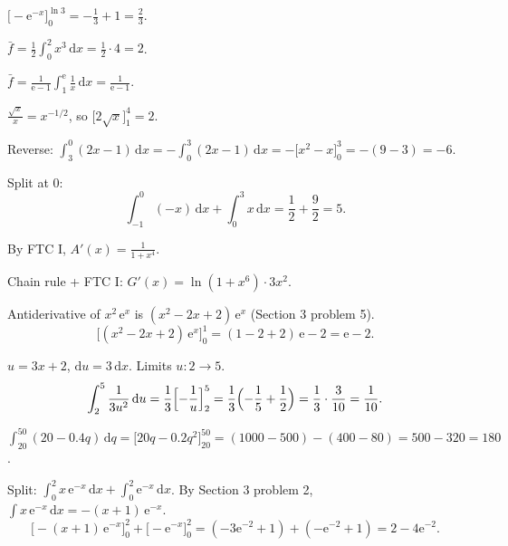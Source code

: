 \begin{solutions}
  \item $\displaystyle\bigl[-\mathrm{e}^{-x}\bigr]_{0}^{\ln 3}
        =-\frac{1}{3}+1=\frac{2}{3}$.

  \item $\displaystyle\bar f=\frac{1}{2}\int_{0}^{2} x^{3}\,\mathrm{d}x
        =\frac{1}{2}\cdot 4=2$.

  \item $\displaystyle\bar f=\frac{1}{\mathrm{e}-1}\int_{1}^{\mathrm{e}}
        \frac{1}{x}\,\mathrm{d}x=\frac{1}{\mathrm{e}-1}$.

  \item $\displaystyle\frac{\sqrt{x}}{x}=x^{-1/2}$, so
        $\bigl[2\sqrt{x}\bigr]_{1}^{4}=2$.

  \item Reverse:
        $\displaystyle\int_{3}^{0} (2x-1)\,\mathrm{d}x
        =-\int_{0}^{3} (2x-1)\,\mathrm{d}x
        =-\bigl[x^{2}-x\bigr]_{0}^{3}=-(9-3)=-6$.

  \item Split at $0$:
        \[
          \int_{-1}^{0} (-x)\,\mathrm{d}x+\int_{0}^{3} x\,\mathrm{d}x
          =\frac{1}{2}+\frac{9}{2}=5 .
        \]

  \item By FTC I, $\displaystyle A'(x)=\frac{1}{1+x^{4}}$.

  \item Chain rule + FTC I: $G'(x)=\ln(1+x^{6})\cdot 3x^{2}$.

  \item Antiderivative of $x^{2}\,\mathrm{e}^{x}$ is
        $(x^{2}-2x+2)\,\mathrm{e}^{x}$ (Section 3 problem 5).
        \[
          \bigl[(x^{2}-2x+2)\,\mathrm{e}^{x}\bigr]_{0}^{1}
            =(1-2+2)\,\mathrm{e}-2=\mathrm{e}-2 .
        \]

  \item $u=3x+2$, $\mathrm{d}u=3\,\mathrm{d}x$. Limits $u:2\to 5$.
        \[
          \int_{2}^{5} \frac{1}{3u^{2}}\,\mathrm{d}u
            =\frac{1}{3}\Bigl[-\frac{1}{u}\Bigr]_{2}^{5}
            =\frac{1}{3}\Bigl(-\frac{1}{5}+\frac{1}{2}\Bigr)
            =\frac{1}{3}\cdot\frac{3}{10}=\frac{1}{10} .
        \]

  \item $\displaystyle\int_{20}^{50} (20-0.4q)\,\mathrm{d}q
        =\bigl[20q-0.2q^{2}\bigr]_{20}^{50}
        =(1000-500)-(400-80)=500-320=180$.

  \item Split:
        $\displaystyle\int_{0}^{2} x\,\mathrm{e}^{-x}\,\mathrm{d}x
        +\int_{0}^{2} \mathrm{e}^{-x}\,\mathrm{d}x$. By Section 3
        problem 2, $\int x\,\mathrm{e}^{-x}\,\mathrm{d}x=-(x+1)\,\mathrm{e}^{-x}$.
        \[
          \bigl[-(x+1)\,\mathrm{e}^{-x}\bigr]_{0}^{2}
           +\bigl[-\mathrm{e}^{-x}\bigr]_{0}^{2}
          =(-3\mathrm{e}^{-2}+1)+(-\mathrm{e}^{-2}+1)
          =2-4\mathrm{e}^{-2} .
        \]


\end{solutions}
